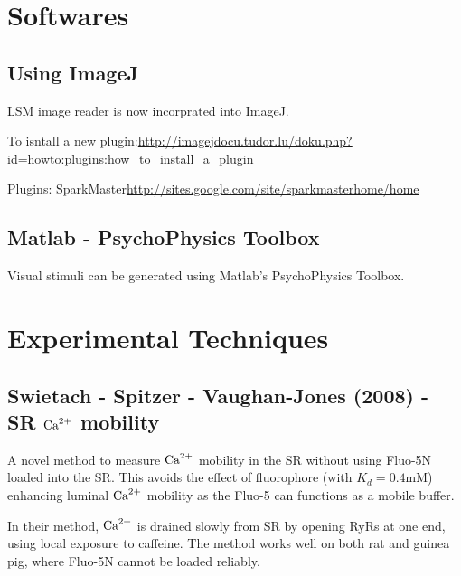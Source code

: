 \section{Softwares}

\subsection{Using ImageJ}

LSM image reader is now incorprated into ImageJ.

To isntall a new
plugin:\url{http://imagejdocu.tudor.lu/doku.php?id=howto:plugins:how_to_install_a_plugin}

Plugins: SparkMaster\url{http://sites.google.com/site/sparkmasterhome/home}

\subsection{Matlab - PsychoPhysics Toolbox}

Visual stimuli can be generated using Matlab's PsychoPhysics Toolbox.

\section{Experimental Techniques}

\subsection[SSV2008 - calcium mobility in SR]{Swietach - Spitzer - Vaughan-Jones
(2008) - SR ${\text{Ca}^{2+}}$ mobility}

A novel method to measure ${\text{Ca}^{2+}}$ mobility in the SR without using Fluo-5N loaded
into the SR. This avoids the effect of fluorophore (with $K_d=0.4$mM) enhancing
luminal ${\text{Ca}^{2+}}$ mobility as the Fluo-5 can functions as a mobile buffer.

In their method, ${\text{Ca}^{2+}}$ is drained slowly from SR by opening RyRs at one end,
using local exposure to caffeine. The method works well on both rat and guinea
pig, where Fluo-5N cannot be loaded reliably.


